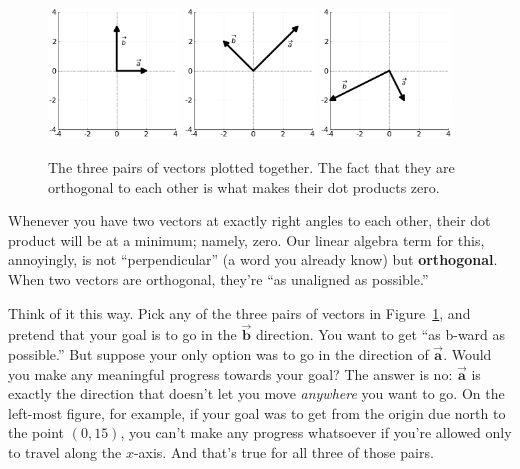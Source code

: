 \begin{figure}[ht]
\centering
\includegraphics[width=0.31\textwidth]{dotProduct1.png}
\includegraphics[width=0.31\textwidth]{dotProduct2.png}
\includegraphics[width=0.31\textwidth]{dotProduct3.png}
\caption{The three pairs of vectors plotted together. The fact that they are
orthogonal to each other is what makes their dot products zero.}
\label{fig:allTogether}
\end{figure}

\label{orthogonalMeansZeroDotProduct}

Whenever you have two vectors at exactly right angles to each other, their dot
product will be at a minimum; namely, zero. Our linear algebra term for this,
annoyingly, is not ``perpendicular'' (a word you already know) but
\textbf{orthogonal}. When two vectors are orthogonal, they're ``as unaligned as
possible.''

Think of it this way. Pick any of the three pairs of vectors in
Figure~\ref{fig:allTogether}, and pretend that your goal is to go in the
$\overrightarrow{\textbf{b}}$ direction. You want to get ``as b-ward as
possible.'' But suppose your only option was to go in the direction of
$\overrightarrow{\textbf{a}}$. Would you make any meaningful progress towards
your goal? The answer is no: $\overrightarrow{\textbf{a}}$ is exactly the
direction that doesn't let you move \textit{anywhere} you want to go. On the
left-most figure, for example, if your goal was to get from the origin due
north to the point $(0,15)$, you can't make any progress whatsoever if you're
allowed only to travel along the $x$-axis. And that's true for all three of
those pairs.

